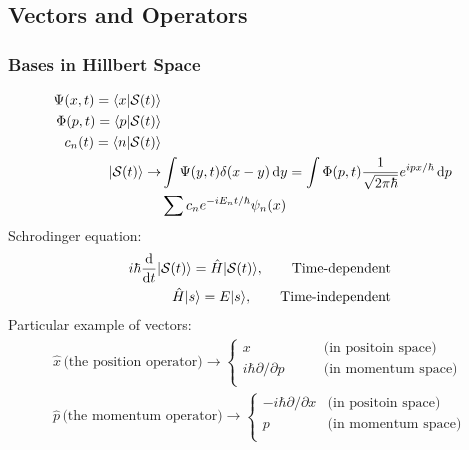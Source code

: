 \documentclass[a4paper,12pt]{article}
\begin{document}
\subsection{Vectors and Operators}
\subsubsection{Bases in Hillbert Space}
       \[\begin{aligned}
              \Psi(x,t) = \langle x|\mathcal{S}(t)\rangle \\
       \Phi(p,t) = \langle p|\mathcal{S}(t)\rangle \\
       c_n(t) = \langle n|\mathcal{S}(t)\rangle \\
              |\mathcal{S}(t)\rangle \rightarrow &\int\Psi(y,t)\delta(x-y)\,{\rm d}y
               = \int\Phi(p,t)\frac{1}{\sqrt{2\pi\hbar}}e^{ipx/\hbar}\,{\rm d}p \\
                                          &\sum c_ne^{-iE_nt/\hbar}\psi_n(x)
       \end{aligned}\]
Schrodinger equation:
       \[
\begin{aligned}
       i\hbar\dv{t}|\mathcal{S}(t)\rangle = \hat{H} |\mathcal{S}(t)\rangle,\qquad \text{Time-dependent} \\
       \hat{H}|s\rangle = E|s\rangle,\qquad\text{Time-independent}
\end{aligned}       
\]
Particular example of vectors:
\[
  \begin{aligned}
         \hat{x} \,\text{(the position operator)} \rightarrow \begin{cases}
                x  &\text{(in positoin space)}\\
                i\hbar\partial/\partial p  \qquad&\text{(in momentum space)}\\
         \end{cases} \\
         \hat{p} \,\text{(the momentum operator)} \rightarrow \begin{cases}
              -i\hbar\partial/\partial x  &\text{(in positoin space)}\\
              p  \qquad &\text{(in momentum space)}\\
       \end{cases}
  \end{aligned}     
\]
\end{document}

